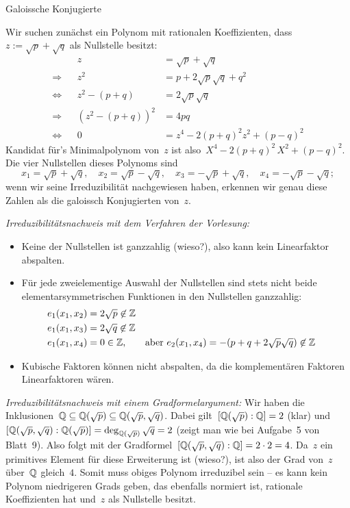 \documentclass{algblatt}
\begin{document}
\begin{aufgabe}{Galoissche Konjugierte}
\begin{loesungE}
\item Wir suchen zunächst ein Polynom mit rationalen Koeffizienten, dass~$z :=
\sqrt{p} + \sqrt{q}$ als Nullstelle besitzt:
\begin{align*}
  && z &= \sqrt{p} + \sqrt{q} \\
  \Longrightarrow && z^2 &= p + 2\sqrt{p}\sqrt{q} + q^2 \\
  \Longleftrightarrow && z^2 - (p+q) &= 2\sqrt{p}\sqrt{q} \\
  \Longrightarrow && \left(z^2 - (p+q)\right)^2 &= 4pq \\
  \Longleftrightarrow && 0 &= z^4 - 2(p+q)^2z^2 + (p-q)^2
\end{align*}
Kandidat für's Minimalpolynom von~$z$ ist also~$X^4 - 2(p+q)^2\,X^2 + (p-q)^2$.
Die vier Nullstellen dieses Polynoms sind
\[
  x_1 = \sqrt{p} + \sqrt{q},\quad
  x_2 = \sqrt{p} - \sqrt{q},\quad
  x_3 = -\sqrt{p} + \sqrt{q},\quad
  x_4 = -\sqrt{p} - \sqrt{q};
\]
wenn wir seine Irreduzibilität nachgewiesen haben, erkennen wir genau diese
Zahlen als die galoissch Konjugierten von~$z$.

\emph{Irreduzibilitätsnachweis mit dem Verfahren der Vorlesung:}
\begin{itemize}
\item Keine der Nullstellen ist ganzzahlig (wieso?), also
kann kein Linearfaktor abspalten.

\item Für jede zweielementige Auswahl der Nullstellen
sind stets nicht beide elementarsymmetrischen Funktionen in den Nullstellen
ganzzahlig:
\begin{align*}
  e_1(x_1,x_2) &= 2\sqrt{p} \not\in \mathbb{Z} \\
  e_1(x_1,x_3) &= 2\sqrt{q} \not\in \mathbb{Z} \\
  e_1(x_1,x_4) &= 0 \in \mathbb{Z}, & \text{aber } e_2(x_1,x_4) &= -(p+q+2\sqrt{p}\sqrt{q}) \not\in \mathbb{Z}
\end{align*}

\item Kubische Faktoren können nicht abspalten, da die
komplementären Faktoren Linearfaktoren wären.
\end{itemize}

\emph{Irreduzibilitätsnachweis mit einem Gradformelargument:}
Wir haben die Inklusionen~$\mathbb{Q} \subseteq \mathbb{Q}(\sqrt{p}) \subseteq
\mathbb{Q}(\sqrt{p},\sqrt{q})$. Dabei gilt~$[\mathbb{Q}(\sqrt{p}):\mathbb{Q}] = 2$ (klar)
und~$[\mathbb{Q}(\sqrt{p},\sqrt{q}):\mathbb{Q}(\sqrt{p})] = \deg_{\mathbb{Q}(\sqrt{p})}
\sqrt{q} = 2$ (zeigt man wie bei Aufgabe~5 von Blatt~9). Also folgt mit der
Gradformel~$[\mathbb{Q}(\sqrt{p},\sqrt{q}):\mathbb{Q}] = 2 \cdot 2 = 4$.
Da~$z$ ein primitives Element für diese Erweiterung ist
(wieso?), ist also der Grad von~$z$ über~$\mathbb{Q}$ gleich~$4$. Somit muss obiges
Polynom irreduzibel sein -- es kann kein Polynom niedrigeren Grads geben, das
ebenfalls normiert ist, rationale Koeffizienten hat und~$z$ als Nullstelle
besitzt.


\end{loesungE}
\end{aufgabe}
\end{document}
